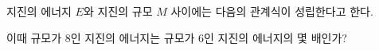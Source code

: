 지진의 에너지 $E$와 지진의 규모 $M$ 사이에는 다음의 관계식이 성립한다고 한다. \par\smallskip{}\par\smallskip\noindent 이때 규모가 $8$인 지진의 에너지는 규모가 $6$인 지진의 에너지의 몇 배인가?
